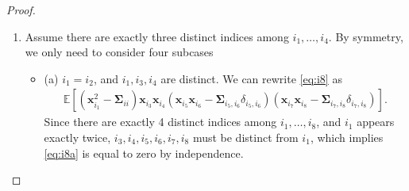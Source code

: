\documentclass[twoside,11pt]{article}
\newcommand{\E}{\mathbb{E}}
\def\bA{{\boldsymbol A}}
\def\bx{{\boldsymbol x}}
\def\bSigma{{\boldsymbol \Sigma}}
\newcommand{\1}{\mathbf{1}}
\def\msf{\mathsf}
\begin{document}
\begin{proof}
\begin{enumerate}
\begin{align}
        C \left(\sum_{i_1< i_2,i_3< i_4} |\bA_{i_1i_2,i_3i_4}|^2\right)=C\|\bA\|_{\msf F}^2\leq C d^2 \|\bA\|^2 =O(d^2).
    \end{align}
    \item Assume there are exactly three distinct indices among $i_1,\dots, i_4$.  By symmetry, we only need to consider four subcases 
    \begin{itemize}
        \item (a) $i_1=i_2$, and $i_1,i_3,i_4$ are distinct. We can rewrite \eqref{eq:i8} as 
        \begin{align}\label{eq:i8a}
            \E[(\bx_{i_1}^2-\bSigma_{ii})\bx_{i_3}\bx_{i_4}(\bx_{i_5}\bx_{i_6}-\bSigma_{i_5,i_6}\delta_{i_5,i_6})(\bx_{i_7}\bx_{i_8}-\bSigma_{i_7,i_8}\delta_{i_7,i_8})].
        \end{align}
      Since there are exactly 4 distinct indices among $i_1,\dots,i_8$, and $i_1$ appears exactly twice,  $i_3,i_4,i_5,i_6,i_7,i_8$ must be distinct from $i_1$, which implies \eqref{eq:i8a} is equal to zero by independence.
    
      


\end{itemize}
\end{enumerate}
\end{proof}
\end{document}
